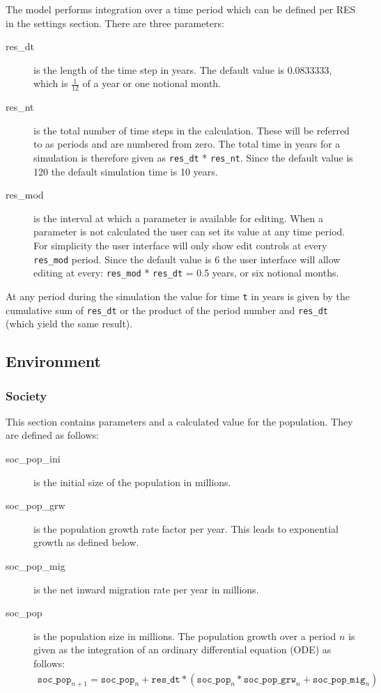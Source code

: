 \documentclass[notitlepage,a4paper]{article}
\begin{document}
The model performs integration over a time period which can be defined per RES in the settings section. There are three parameters:

\begin{description}
\item[res\_dt] is the length of the time step in years.  The default value is 0.0833333, which is $\frac{1}{12}$  of a year or one notional month.
\item[res\_nt] is the total number of time steps in the calculation. These will be referred to as periods and are numbered from zero. The total time in years for a simulation is therefore given as \texttt{res\_dt} * \texttt{res\_nt}. Since the default value is 120 the default simulation time is 10 years.
\item[res\_mod] is the interval at which a parameter is available for editing. When a parameter is not calculated the user can set its value at any time period. For simplicity the user interface will only show edit controls at every \texttt{res\_mod} period.  Since the default value is 6 the user interface will allow editing at every: \texttt{res\_mod} * \texttt{res\_dt} = 0.5 years, or six notional months.
\end{description}

At any period during the simulation the value for time \texttt{t} in years is given by the cumulative sum of \texttt{res\_dt} or the product of the period number and \texttt{res\_dt} (which yield the same result).

\subsection{Environment}

\subsubsection{Society}
\label{sec:pop}

This section contains parameters and a calculated value for the population. They are defined as follows:

\begin{description}
\item[soc\_pop\_ini] is the initial size of the population in millions.
\item[soc\_pop\_grw] is the population growth rate factor per year. This leads to exponential growth as defined below.
\item[soc\_pop\_mig] is the net inward migration rate per year in millions.
\item[soc\_pop] is the population size in millions.  The population growth over a period $n$ is given as the integration of an ordinary differential equation (ODE) as follows:
\begin{eqnarray}
\texttt{soc\_pop}_{n+1} = \texttt{soc\_pop}_n + \texttt{res\_dt} * (\texttt{soc\_pop}_n * \texttt{soc\_pop\_grw}_n + \texttt{soc\_pop\_mig}_n)
\end{eqnarray}
\end{description}
\end{document}
